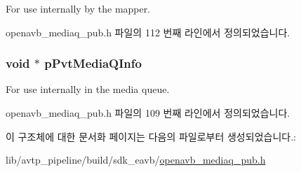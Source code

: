 For use internally by the mapper. 



openavb\+\_\+mediaq\+\_\+pub.\+h 파일의 112 번째 라인에서 정의되었습니다.

\subsubsection[{\texorpdfstring{p\+Pvt\+Media\+Q\+Info}{pPvtMediaQInfo}}]{\setlength{\rightskip}{0pt plus 5cm}void $\ast$ p\+Pvt\+Media\+Q\+Info\hspace{0.3cm}{\ttfamily [private]}}\hypertarget{structmedia__q__t_acb2a0999918038ea5c47311434ce7354}{}\label{structmedia__q__t_acb2a0999918038ea5c47311434ce7354}


For use internally in the media queue. 



openavb\+\_\+mediaq\+\_\+pub.\+h 파일의 109 번째 라인에서 정의되었습니다.



이 구조체에 대한 문서화 페이지는 다음의 파일로부터 생성되었습니다.\+:\begin{DoxyCompactItemize}
\item 
lib/avtp\+\_\+pipeline/build/sdk\+\_\+eavb/\hyperlink{build_2sdk__eavb_2openavb__mediaq__pub_8h}{openavb\+\_\+mediaq\+\_\+pub.\+h}\end{DoxyCompactItemize}
